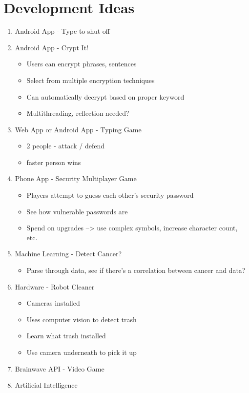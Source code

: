 \documentclass[10pt]{article}
\begin{document}
\section*{Development Ideas}
\begin{enumerate}
    \item Android App - Type to shut off
    \item Android App - Crypt It!
    \begin{itemize}
        \item Users can encrypt phrases, sentences
        \item Select from multiple encryption techniques
        \item Can automatically decrypt based on proper keyword
        \item Multithreading, reflection needed?
    \end{itemize}
    \item Web App or Android App - Typing Game
    \begin{itemize}
        \item 2 people - attack / defend
        \item faster person wins
    \end{itemize}
    \item Phone App - Security Multiplayer Game
    \begin{itemize}
        \item Players attempt to guess each other's security password
        \item See how vulnerable passwords are
        \item Spend on upgrades --> use complex symbols, increase character count, etc.
    \end{itemize}
    \item Machine Learning - Detect Cancer?
    \begin{itemize}
        \item Parse through data, see if there's a correlation between cancer and data?
    \end{itemize}
    \item Hardware - Robot Cleaner
    \begin{itemize}
        \item Cameras installed
        \item Uses computer vision to detect trash
        \item Learn what trash installed
        \item Use camera underneath to pick it up
    \end{itemize}
    \item Brainwave API - Video Game
    \item Artificial Intelligence
\end{enumerate}
\end{document}
